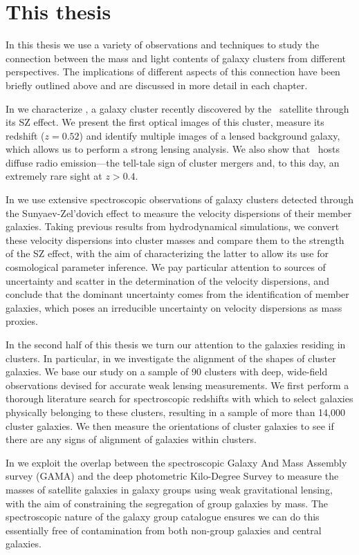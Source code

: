 \section{This thesis}

In this thesis we use a variety of observations and techniques to study the connection between the mass and light contents of galaxy clusters from different perspectives. The implications of different aspects of this connection have been briefly outlined above and are discussed in more detail in each chapter.

In  we characterize \plck, a galaxy cluster recently discovered by the \planck\ satellite through its SZ effect. We present the first optical images of this cluster, measure its redshift ($z=0.52$) and identify multiple images of a lensed background galaxy, which allows us to perform a strong lensing analysis. We also show that \plck\ hosts diffuse radio emission---the tell-tale sign of cluster mergers and, to this day, an extremely rare sight at $z>0.4$.

In  we use extensive spectroscopic observations of galaxy clusters detected through the Sunyaev-Zel'dovich effect to measure the velocity dispersions of their member galaxies. Taking previous results from hydrodynamical simulations, we convert these velocity dispersions into cluster masses and compare them to the strength of the SZ effect, with the aim of characterizing the latter to allow its use for cosmological parameter inference. We pay particular attention to sources of uncertainty and scatter in the determination of the velocity dispersions, and conclude that the dominant uncertainty comes from the identification of member galaxies, which poses an irreducible uncertainty on velocity dispersions as mass proxies.

In the second half of this thesis we turn our attention to the galaxies residing in clusters. In particular, in  we investigate the alignment of the shapes of cluster galaxies. We base our study on a sample of 90 clusters with deep, wide-field observations devised for accurate weak lensing measurements. We first perform a thorough literature search for spectroscopic redshifts with which to select galaxies physically belonging to these clusters, resulting in a sample of more than 14,000 cluster galaxies. We then measure the orientations of cluster galaxies to see if there are any signs of alignment of galaxies within clusters.

In  we exploit the overlap between the spectroscopic Galaxy And Mass Assembly survey (GAMA) and the deep photometric Kilo-Degree Survey to measure the masses of satellite galaxies in galaxy groups using weak gravitational lensing, with the aim of constraining the segregation of group galaxies by mass. The spectroscopic nature of the galaxy group catalogue ensures we can do this essentially free of contamination from both non-group galaxies and central galaxies.

